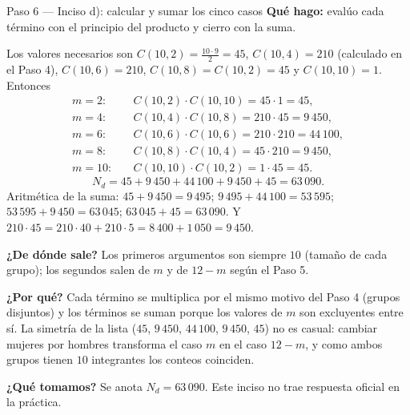 \documentclass[11pt]{article}
\begin{document}
\begin{paso}{Paso 6 --- Inciso d): calcular y sumar los cinco casos}
\textbf{Qué hago:} evalúo cada término con el principio del producto y cierro con la suma.

Los valores necesarios son $C(10,2)=\frac{10\cdot 9}{2}=45$, $C(10,4)=210$ (calculado en el Paso 4), $C(10,6)=210$, $C(10,8)=C(10,2)=45$ y $C(10,10)=1$. Entonces
\begin{align*}
  m=2:&\quad C(10,2)\cdot C(10,10)=45\cdot 1 = 45,\\
  m=4:&\quad C(10,4)\cdot C(10,8)=210\cdot 45 = 9\,450,\\
  m=6:&\quad C(10,6)\cdot C(10,6)=210\cdot 210 = 44\,100,\\
  m=8:&\quad C(10,8)\cdot C(10,4)=45\cdot 210 = 9\,450,\\
  m=10:&\quad C(10,10)\cdot C(10,2)=1\cdot 45 = 45 .
\end{align*}
\[
  N_d = 45+9\,450+44\,100+9\,450+45 = 63\,090 .
\]
Aritmética de la suma: $45+9\,450=9\,495$; $9\,495+44\,100=53\,595$; $53\,595+9\,450=63\,045$; $63\,045+45=63\,090$. Y $210\cdot 45 = 210\cdot 40 + 210\cdot 5 = 8\,400+1\,050=9\,450$.

\textbf{¿De dónde sale?} Los primeros argumentos son siempre $10$ (tamaño de cada grupo); los segundos salen de $m$ y de $12-m$ según el Paso 5.

\textbf{¿Por qué?} Cada término se multiplica por el mismo motivo del Paso 4 (grupos disjuntos) y los términos se suman porque los valores de $m$ son excluyentes entre sí. La simetría de la lista ($45$, $9\,450$, $44\,100$, $9\,450$, $45$) no es casual: cambiar mujeres por hombres transforma el caso $m$ en el caso $12-m$, y como ambos grupos tienen $10$ integrantes los conteos coinciden.

\textbf{¿Qué tomamos?} Se anota $N_d=63\,090$. Este inciso no trae respuesta oficial en la práctica.
\end{paso}
\end{document}

